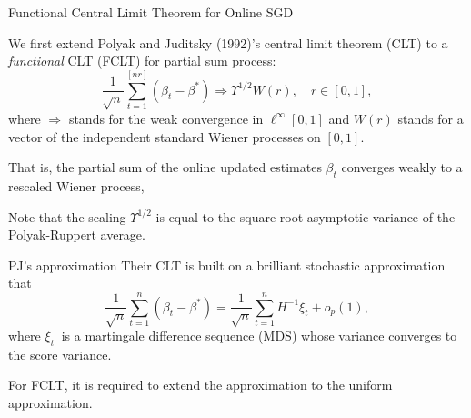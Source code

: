 \documentclass[beamer, t]{beamer}
\begin{document}
\begin{frame}{ Functional Central Limit Theorem for Online SGD}

We first  extend
Polyak and Juditsky (1992)'s central limit theorem (CLT) to a \emph{functional} CLT (FCLT) for partial sum process:
\begin{equation*}\label{eq4}
\frac{1}{\sqrt{n}}\sum_{t=1}^{\left[nr\right]}\left(\beta_{t}-\beta^{*}\right)\Rightarrow \Upsilon^{1/2}W\left(r\right),\quad r\in\left[0,1\right],
\end{equation*}
where $\Rightarrow$ stands for the weak convergence in $\ell^{\infty}\left[0,1\right]$
and $W\left(r\right)$ stands for a vector of the independent standard
Wiener processes on $\left[0,1\right]$.

\bigskip
That is, the partial sum of the online updated estimates $\beta_t$ converges weakly to a rescaled Wiener process,

\bigskip 
Note that the scaling $\Upsilon^{1/2}$ is equal to the square root  asymptotic variance of the Polyak-Ruppert average.

\end{frame}

\begin{frame}{PJ's approximation}
	Their CLT is built on a brilliant stochastic approximation that 
	\[  \frac{1}{\sqrt{n}}\sum_{t=1}^{n}\left(\beta_{t}-\beta^{*}\right) = \frac{1}{\sqrt{n}}\sum_{t=1}^{n}H^{-1}\xi_{t} + o_p (1),
	 \]
	 where $ \xi_{t}\ $ is a martingale difference sequence (MDS) whose variance converges to the score variance. 
	 \bigskip
	 
	 For FCLT, it is required to extend the approximation to the uniform approximation. 
\end{frame}
\end{document}
